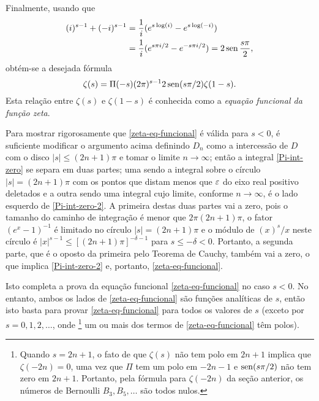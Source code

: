     Finalmente, usando que
    \begin{align*}
        (i)^{s-1} + (-i)^{s-1} & = \frac{1}{i}(e^{s \log (i)} - e^{s \log (-i)}) \\
        &= \frac{1}{i}(e^{s \pi i/2} - e^{-s \pi i/2}) = 2 \operatorname{sen} \frac{s\pi}{2},
    \end{align*}
    obtém-se a desejada fórmula
    \begin{equation}
        \label{zeta-eq-funcional}
        \zeta(s) = \Pi(-s) (2\pi)^{s-1} 2 \operatorname{sen} (s\pi/2)\zeta(1-s).
    \end{equation}
    Esta relação entre $\zeta(s)$ e $\zeta(1-s)$ é conhecida como a \textit{equação funcional da função zeta}.
    
    Para mostrar rigorosamente que \eqref{zeta-eq-funcional} é válida para $s<0$, é suficiente modificar o argumento acima definindo $D_n$ como a intercessão de $D$ com o disco $|s| \leq (2n+1)\pi$ e tomar o limite $n \to \infty$; então a integral  \eqref{Pi-int-zero} se separa em duas partes; uma sendo a integral sobre o círculo $|s| = (2n + 1)\pi$ com os pontos que distam menos que $\varepsilon$ do eixo real positivo deletados e a outra sendo uma integral cujo limite, conforme $n \to \infty$, é o lado esquerdo de \eqref{Pi-int-zero-2}. A primeira destas duas partes vai a zero, pois o tamanho do caminho de integração é menor que $2\pi (2n+1)\pi$, o fator $(e^x - 1)^{-1}$ é limitado no círculo $|s| = (2n + 1)\pi$ e o módulo de $(x)^s/x$ neste círculo é $|x|^{s-1} \leq [(2n + 1)\pi]^{-\delta -1}$ para $s \leq - \delta < 0$. Portanto, a segunda parte, que é o oposto da primeira pelo Teorema de Cauchy, também vai a zero, o que implica \eqref{Pi-int-zero-2} e, portanto, \eqref{zeta-eq-funcional}.
    
    Isto completa a prova da equação funcional \eqref{zeta-eq-funcional} no caso $s < 0$. No entanto, ambos os lados de \eqref{zeta-eq-funcional} são funções analíticas de $s$, então isto basta para provar \eqref{zeta-eq-funcional} para todos os valores de $s$ (exceto por $s = 0, 1, 2, \dots $, onde 
    \footnote{ Quando $s = 2n + 1$, o fato de que $\zeta(s)$ não tem polo em $2n + 1$ implica que $\zeta(-2n) = 0$, uma vez que $\Pi$ tem um polo em $-2n-1$ e $\operatorname{sen} (s\pi/2)$ não tem zero em $2n + 1$. Portanto, pela fórmula para $\zeta(-2n)$ da seção anterior, os números de Bernoulli $B_3, B_5, \dots$ são todos nulos.
    }
    um ou mais dos termos de \eqref{zeta-eq-funcional} têm polos).
    
    
    
    
    
    
    
    
    
    
    
    
    
    













